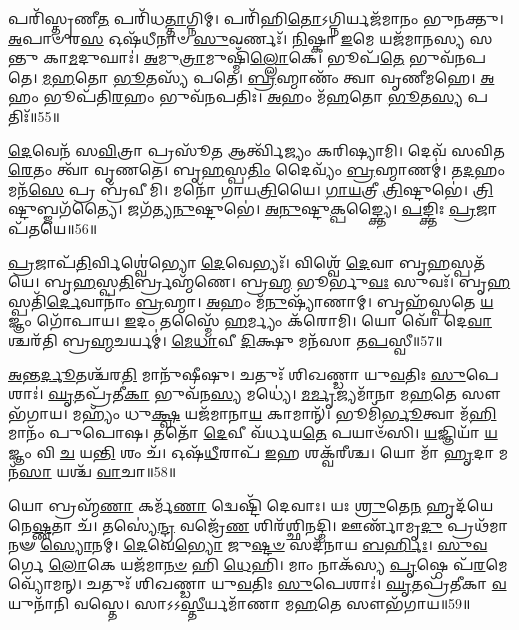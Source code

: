 𑌪𑌰𑌿᳴𑌸𑍍𑌤𑍃𑌣𑍀\-\ul{𑌤} 𑌪𑌰𑌿᳴𑌧\-\ul{𑌤𑍍𑌤𑌾}\-𑌗𑍍𑌨𑌿𑌮𑍍।
𑌪𑌰𑌿᳴𑌹𑌿\-\ul{𑌤𑍋}\-\-𑌽𑌗𑍍𑌨𑌿𑌰𑍍𑌯𑌜᳴𑌮𑌾𑌨𑌂 𑌭𑍁𑌨𑌕𑍍𑌤𑍁।
\-\ul{𑌅}\-𑌪𑌾𑍞 𑌰\-\ul{𑌸} 𑌓𑌷᳴𑌧𑍀𑌨𑌾𑍞 \ul{𑌸𑍁}\-𑌵𑌰𑍍𑌣𑌃᳴।
\-\ul{𑌨𑌿}\-𑌷𑍍𑌕𑌾 \ul{𑌇}\-𑌮𑍇 𑌯𑌜᳴𑌮𑌾𑌨𑌸𑍍𑌯 𑌸𑌨𑍍𑌤𑍁 𑌕𑌾\-\ul{𑌮}\-𑌦𑍁𑌘𑌾𑌃॑।
\-\ul{𑌅}\-𑌮𑍁\-\ul{𑌤𑍍𑌰𑌾}\-𑌮𑍁𑌷𑍍𑌮𑌿𑌁᳴\-\ul{𑌲𑍍𑌲𑍋}\-𑌕𑍇।
𑌭𑍂𑌪᳴\-\ul{𑌤𑍇} 𑌭𑍁𑌵᳴𑌨𑌪𑌤𑍇।
\-\ul{𑌮}\-\-\ul{𑌹}\-𑌤𑍋 \ul{𑌭𑍂}\-𑌤𑌸𑍍𑌯᳴ 𑌪𑌤𑍇।
\-\ul{𑌬𑍍𑌰}\-𑌹𑍍𑌮𑌾𑌣𑌂᳴ 𑌤𑍍𑌵𑌾 𑌵𑍃𑌣𑍀𑌮𑌹𑍇।
\-\ul{𑌅}\-𑌹𑌂 𑌭𑍂𑌪᳴𑌤𑌿\-\ul{𑌰}\-𑌹𑌂 𑌭𑍁𑌵᳴𑌨𑌪𑌤𑌿𑌃।
\-\ul{𑌅}\-𑌹𑌂 𑌮᳴\-\ul{𑌹}\-𑌤𑍋 \ul{𑌭𑍂}\-𑌤\-\ul{𑌸𑍍𑌯} 𑌪𑌤𑌿𑌃᳴॥55॥

\-\ul{𑌦𑍇}\-𑌵𑍇𑌨᳴ 𑌸\-\ul{𑌵𑌿}\-𑌤𑍍𑌰𑌾 𑌪𑍍𑌰𑌸𑍂᳴\-\ul{𑌤} 𑌆𑌰𑍍𑌤𑍍𑌵𑌿᳴𑌜𑍍𑌯𑌂 𑌕𑌰𑌿𑌷𑍍𑌯𑌾𑌮𑌿।
𑌦𑍇𑌵᳴ 𑌸𑌵𑌿𑌤\-\ul{𑌰𑍇}\-𑌤𑌂 𑌤𑍍𑌵𑌾᳴ 𑌵𑍃𑌣𑌤𑍇।
𑌬𑍃\-\ul{𑌹}\-𑌸𑍍𑌪\-\ul{𑌤𑌿𑌂} 𑌦𑍈𑌵𑍍𑌯𑌂᳴ \ul{𑌬𑍍𑌰}\-𑌹𑍍𑌮𑌾𑌣𑌮𑍍॑।
𑌤\-\ul{𑌦}\-𑌹𑌂 𑌮𑌨᳴\-\ul{𑌸𑍇} 𑌪𑍍𑌰 𑌬𑍍𑌰᳴𑌵𑍀𑌮𑌿।
𑌮𑌨𑍋᳴ 𑌗𑌾𑌯\-\ul{𑌤𑍍𑌰𑌿}\-𑌯𑍈।
\-\ul{𑌗𑌾}\-\-\ul{𑌯}\-𑌤𑍍𑌰𑍀 \ul{𑌤𑍍𑌰𑌿}\-𑌷𑍍𑌟𑍁𑌭𑍇॑।
\-\ul{𑌤𑍍𑌰𑌿}\-𑌷𑍍𑌟𑍁𑌬𑍍𑌜𑌗᳴𑌤𑍍𑌯𑍈।
𑌜𑌗᳴𑌤𑍍𑌯\-\ul{𑌨𑍁}\-𑌷𑍍𑌟𑍁𑌭𑍇॑।
\-\ul{𑌅}\-\-\ul{𑌨𑍁}\-𑌷𑍍𑌟𑍁\-\ul{𑌕𑍍𑌪}\-𑌙𑍍𑌕𑍍𑌤𑍍𑌯𑍈।
\-\ul{𑌪}\-𑌙𑍍𑌕𑍍𑌤𑌿𑌃 \ul{𑌪𑍍𑌰}\-𑌜𑌾𑌪᳴𑌤𑌯𑍇॥56॥

\-\ul{𑌪𑍍𑌰}\-𑌜𑌾𑌪᳴\-\ul{𑌤𑌿}\-𑌰𑍍𑌵𑌿𑌶𑍍𑌵𑍇॑𑌭𑍍𑌯𑍋 \ul{𑌦𑍇}\-𑌵𑍇𑌭𑍍𑌯𑌃᳴।
𑌵𑌿𑌶𑍍𑌵𑍇᳴ \ul{𑌦𑍇}\-𑌵𑌾 𑌬𑍃\-\ul{𑌹}\-𑌸𑍍𑌪𑌤᳴𑌯𑍇।
𑌬𑍃\-\ul{𑌹}\-𑌸𑍍𑌪\-\ul{𑌤𑌿}\-𑌰𑍍𑌬𑍍𑌰𑌹𑍍𑌮᳴𑌣𑍇।
𑌬𑍍𑌰\-\ul{𑌹𑍍𑌮} 𑌭𑍂𑌰𑍍𑌭𑍁\-\ul{𑌵𑌃} 𑌸𑍁𑌵𑌃᳴।
𑌬𑍃\-\ul{𑌹}\-𑌸𑍍𑌪𑌤𑌿᳴\-\ul{𑌰𑍍𑌦𑍇}\-𑌵𑌾𑌨𑌾𑌂॑ \ul{𑌬𑍍𑌰}\-𑌹𑍍𑌮𑌾।
\-\ul{𑌅}\-𑌹𑌂 𑌮᳴\-\ul{𑌨𑍁}\-𑌷𑍍𑌯𑌾᳴𑌣𑌾𑌮𑍍।
𑌬𑍃𑌹᳴𑌸𑍍𑌪𑌤𑍇 \ul{𑌯}\-𑌜𑍍𑌞𑌂 𑌗𑍋᳴𑌪𑌾𑌯।
\-\ul{𑌇}\-𑌦𑌂 𑌤𑌸𑍍𑌮𑍈᳴ \ul{𑌹}\-𑌰𑍍𑌮𑍍𑌯𑌂 𑌕᳴𑌰𑍋𑌮𑌿।
𑌯𑍋 𑌵𑍋᳴ 𑌦𑍇\-\ul{𑌵𑌾}\-𑌶𑍍𑌚𑌰᳴𑌤𑌿 𑌬𑍍𑌰\-\ul{𑌹𑍍𑌮}\-𑌚𑌰𑍍𑌯𑌮𑍍॑।
\-\ul{𑌮𑍇}\-\-\ul{𑌧𑌾}\-𑌵𑍀 \ul{𑌦𑌿}\-𑌕𑍍𑌷𑍁 𑌮𑌨᳴𑌸𑌾 𑌤\-\ul{𑌪}\-𑌸𑍍𑌵𑍀॥57॥

\-\ul{𑌅}\-𑌨𑍍𑌤\-\ul{𑌰𑍍𑌦𑍂}\-𑌤𑌶𑍍𑌚᳴𑌰\-\ul{𑌤𑌿} 𑌮𑌾𑌨𑍁᳴𑌷𑍀𑌷𑍁।
𑌚𑌤𑍁𑌃᳴ 𑌶𑌿𑌖𑌣𑍍𑌡𑌾 𑌯𑍁\-\ul{𑌵}\-𑌤𑌿𑌃 \ul{𑌸𑍁}\-𑌪𑍇𑌶𑌾𑌃॑।
\-\ul{𑌘𑍃}\-𑌤𑌪𑍍𑌰᳴𑌤𑍀\-\ul{𑌕𑌾} 𑌭𑍁𑌵᳴𑌨\-\ul{𑌸𑍍𑌯} 𑌮𑌧𑍍𑌯𑍇॑।
\-\ul{𑌮}\-\-\ul{𑌰𑍍𑌮𑍃}\-𑌜𑍍𑌯𑌮𑌾᳴𑌨𑌾 𑌮\-\ul{𑌹}\-𑌤𑍇 𑌸𑍗𑌭᳴𑌗𑌾𑌯।
𑌮𑌹𑍍𑌯𑌂᳴ 𑌧𑍁\-\ul{𑌕𑍍𑌷𑍍𑌵} 𑌯𑌜᳴𑌮𑌾𑌨𑌾\-\ul{𑌯} 𑌕𑌾𑌮𑌾𑌨𑍍᳴।
𑌭𑍂𑌮𑌿᳴\-\ul{𑌰𑍍𑌭𑍂}\-𑌤𑍍𑌵𑌾 𑌮᳴\-\ul{𑌹𑌿}\-𑌮𑌾𑌨𑌂᳴ 𑌪𑍁𑌪𑍋𑌷।
𑌤𑌤𑍋᳴ \ul{𑌦𑍇}\-𑌵𑍀 𑌵᳴𑌰𑍍𑌧𑌯\-\ul{𑌤𑍇} 𑌪𑌯𑌾𑍞᳴𑌸𑌿।
\-\ul{𑌯}\-𑌜𑍍𑌞𑌿𑌯𑌾᳴ \ul{𑌯}\-𑌜𑍍𑌞𑌂 𑌵𑌿 \ul{𑌚} 𑌯\-\ul{𑌨𑍍𑌤𑌿} 𑌶𑌂 𑌚᳴।
𑌓𑌷᳴\-\ul{𑌧𑍀}\-𑌰𑌾𑌪᳴ \ul{𑌇}\-𑌹 𑌶𑌕𑍍𑌵᳴𑌰𑍀𑌶𑍍𑌚।
𑌯𑍋 𑌮𑌾᳴ \ul{𑌹𑍃}\-𑌦𑌾 𑌮𑌨᳴\-\ul{𑌸𑌾} 𑌯𑌶𑍍𑌚᳴ \ul{𑌵𑌾}\-𑌚𑌾॥58॥

𑌯𑍋 𑌬𑍍𑌰𑌹𑍍𑌮᳴\-\ul{𑌣𑌾} 𑌕𑌰𑍍𑌮᳴\-\ul{𑌣𑌾} 𑌦𑍍𑌵𑍇𑌷𑍍𑌟𑌿᳴ 𑌦𑍇𑌵𑌾𑌃।
𑌯𑌃 \ul{𑌶𑍍𑌰𑍁}\-𑌤𑍇\-\ul{𑌨} 𑌹𑍃𑌦᳴𑌯𑍇𑌨𑍇\-\ul{𑌷𑍍𑌣}\-𑌤𑌾 𑌚᳴।
𑌤𑌸𑍍𑌯𑍇॑\-\ul{𑌨𑍍𑌦𑍍𑌰} 𑌵𑌜𑍍𑌰𑍇᳴\-\ul{𑌣} 𑌶𑌿𑌰᳴𑌶𑍍𑌛𑌿𑌨𑌦𑍍𑌮𑌿।
𑌊𑌰𑍍𑌣𑌾᳴𑌮𑍃\-\ul{𑌦𑍁} 𑌪𑍍𑌰𑌥᳴𑌮𑌾𑌨𑍟 \ul{𑌸𑍍𑌯𑍋}\-𑌨𑌮𑍍।
\-\ul{𑌦𑍇}\-𑌵𑍇\-\ul{𑌭𑍍𑌯𑍋} 𑌜𑍁\-\ul{𑌷𑍍𑌟}\-\-\ul{𑍞} 𑌸𑌦᳴𑌨𑌾𑌯 \ul{𑌬}\-\-\ul{𑌰𑍍}\-𑌹𑌿𑌃।
\-\ul{𑌸𑍁}\-\-\ul{𑌵}\-𑌰𑍍𑌗𑍇 \ul{𑌲𑍋}\-𑌕𑍇 𑌯𑌜᳴𑌮𑌾\-\ul{𑌨}\-\-\ul{𑍞} 𑌹𑌿 \ul{𑌧𑍇}\-𑌹𑌿।
𑌮𑌾𑌂 𑌨𑌾𑌕᳴𑌸𑍍𑌯 \ul{𑌪𑍃}\-𑌷𑍍𑌠𑍇 𑌪᳴\-\ul{𑌰}\-𑌮𑍇 𑌵𑍍𑌯𑍋᳴𑌮𑌨𑍍।
𑌚𑌤𑍁𑌃᳴ 𑌶𑌿𑌖𑌣𑍍𑌡𑌾 𑌯𑍁\-\ul{𑌵}\-𑌤𑌿𑌃 \ul{𑌸𑍁}\-𑌪𑍇𑌶𑌾𑌃॑।
\-\ul{𑌘𑍃}\-𑌤𑌪𑍍𑌰᳴𑌤𑍀𑌕𑌾 \ul{𑌵}\-𑌯𑍁𑌨𑌾᳴𑌨𑌿 𑌵𑌸𑍍𑌤𑍇।
𑌸𑌾𑌽𑌽\-\ul{𑌸𑍍𑌤𑍀}\-𑌰𑍍𑌯𑌮𑌾᳴𑌣𑌾 𑌮\-\ul{𑌹}\-𑌤𑍇 𑌸𑍗𑌭᳴𑌗𑌾𑌯॥59॥

